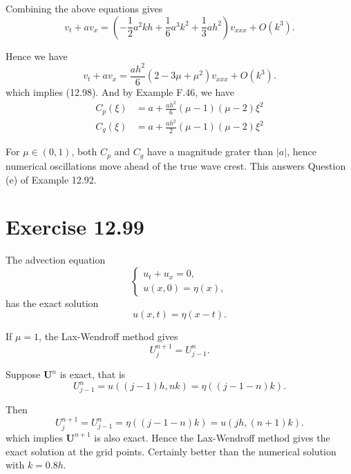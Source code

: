 \documentclass[twocolumn,10pt]{article}
\begin{document}
Combining the above equations gives
\begin{equation*}
    v_t+av_x=(-\frac{1}{2}a^2kh+\frac{1}{6}a^3k^2+\frac{1}{3}ah^2)v_{xxx}+O(k^3).
\end{equation*}

Hence we have
\begin{equation*}
    v_t+av_x=\frac{ah^2}{6}(2-3\mu+\mu^2)v_{xxx}+O(k^3).
\end{equation*}
which implies (12.98). And by Example F.46, we have
\begin{align*}
C_p(\xi) &= a+\frac{ah^2}{6}(\mu-1)(\mu-2)\xi^2\\
C_g(\xi) &= a+\frac{ah^2}{2}(\mu-1)(\mu-2)\xi^2
\end{align*}

For $\mu\in(0,1)$, both $C_p$ and $C_g$ have a magnitude grater than $|a|$, hence numerical oscillations move ahead of the true wave crest. This answers Question (e) of Example 12.92.

\section*{\large Exercise 12.99}

The advection equation
\begin{equation*}
    \left\{
        \begin{array}{l}
            u_t+u_x=0,\\
            u(x,0)=\eta(x),
        \end{array}
    \right.
\end{equation*}
has the exact solution
\begin{equation*}
    u(x,t)=\eta(x-t).
\end{equation*}

If $\mu=1$, the Lax-Wendroff method gives
\begin{equation*}
    U_j^{n+1}=U_{j-1}^n.
\end{equation*}

Suppose $\mathbf{U}^n$ is exact, that is
\begin{equation*}
    U_{j-1}^n=u((j-1)h,nk)=\eta((j-1-n)k).
\end{equation*}

Then
\begin{equation*}
    U_{j}^{n+1}=U_{j-1}^n=\eta((j-1-n)k)=u(jh,(n+1)k).
\end{equation*}
which implies $\mathbf{U}^{n+1}$ is also exact. Hence the Lax-Wendroff method gives the exact solution at the grid points. Certainly better than the numerical solution with $k=0.8h$.
\end{document}
